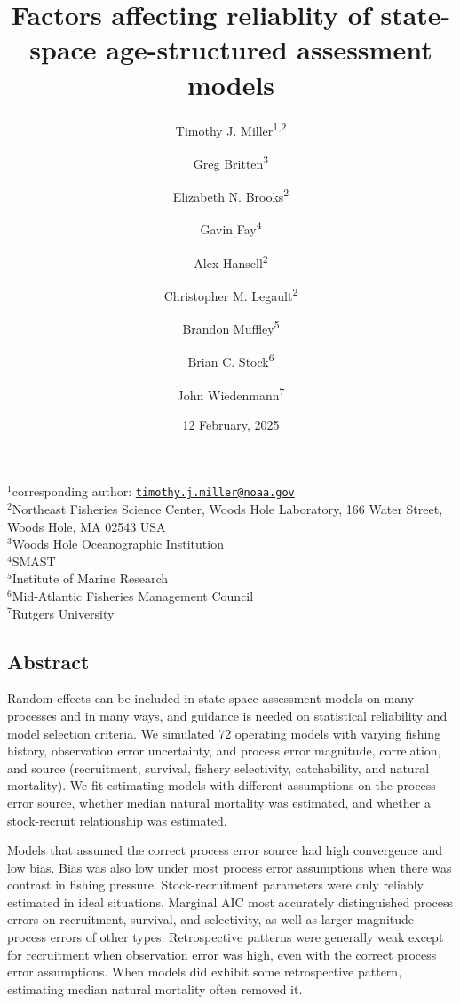 \documentclass[
  12pt,
]{article}
\title{Factors affecting reliablity of state-space age-structured
assessment models}
\author{Timothy J. Miller\textsuperscript{1,2} \and Greg
Britten\textsuperscript{3} \and Elizabeth N.
Brooks\textsuperscript{2} \and Gavin Fay\textsuperscript{4} \and Alex
Hansell\textsuperscript{2} \and Christopher M.
Legault\textsuperscript{2} \and Brandon
Muffley\textsuperscript{5} \and Brian C.
Stock\textsuperscript{6} \and John Wiedenmann\textsuperscript{7}}
\date{12 February, 2025}
\begin{document}
\maketitle

\(^1\)corresponding author:
\href{mailto:timothy.j.miller@noaa.gov}{\nolinkurl{timothy.j.miller@noaa.gov}}\\
\(^2\)Northeast Fisheries Science Center, Woods Hole Laboratory, 166
Water Street, Woods Hole, MA 02543 USA\\
\(^3\)Woods Hole Oceanographic Institution\\
\(^4\)SMAST\\
\(^5\)Institute of Marine Research\\
\(^6\)Mid-Atlantic Fisheries Management Council\\
\(^7\)Rutgers University\\

\pagebreak

\hypertarget{abstract}{%
\subsection*{Abstract}\label{abstract}}

Random effects can be included in state-space assessment models on many
processes and in many ways, and guidance is needed on statistical
reliability and model selection criteria. We simulated 72 operating
models with varying fishing history, observation error uncertainty, and
process error magnitude, correlation, and source (recruitment, survival,
fishery selectivity, catchability, and natural mortality). We fit
estimating models with different assumptions on the process error
source, whether median natural mortality was estimated, and whether a
stock-recruit relationship was estimated.

Models that assumed the correct process error source had high
convergence and low bias. Bias was also low under most process error
assumptions when there was contrast in fishing pressure.
Stock-recruitment parameters were only reliably estimated in ideal
situations. Marginal AIC most accurately distinguished process errors on
recruitment, survival, and selectivity, as well as larger magnitude
process errors of other types. Retrospective patterns were generally
weak except for recruitment when observation error was high, even with
the correct process error assumptions. When models did exhibit some
retrospective pattern, estimating median natural mortality often removed
it.
\end{document}
